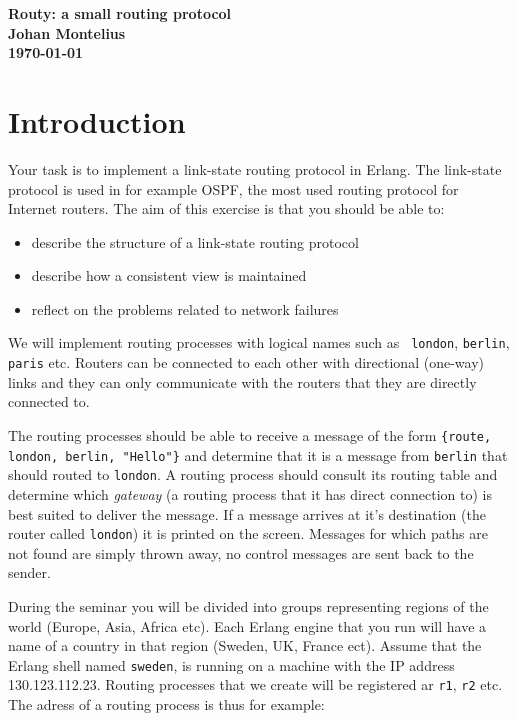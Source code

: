 \documentclass[a4paper, 11pt]{article}
\newcommand{\nnsection}[1]{
\section*{#1}
\addcontentsline{toc}{section}{#1}
}
\begin{document}
\begin{center}
\vspace{20pt}
\textbf{\large Routy: a small routing protocol}\\
\vspace{10pt}
\textbf{Johan Montelius}\\
\vspace{10pt}
\textbf{\today}
\end{center}

\nnsection{Introduction}

Your task is to implement a link-state routing protocol in Erlang. The
link-state protocol is used in for example OSPF, the most used routing
protocol for Internet routers. The aim of this exercise is that you
should be able to:

\begin{itemize}
\item describe the structure of a link-state routing protocol
\item describe how a consistent view is maintained
\item reflect on the problems related to network failures
\end{itemize}

We will implement routing processes with logical names such as {\tt
london}, {\tt berlin}, {\tt paris} etc. Routers can be connected to
each other with directional (one-way) links  and they can only communicate with
the routers that they are directly connected to.

The routing processes should be able to receive a message of the form
{\tt \{route, london, berlin, "Hello"\}} and determine that it is a
message from {\tt berlin} that should routed to {\tt london}. A
routing process should consult its routing table and determine which
{\em gateway} (a routing process that it has direct connection to) is
best suited to deliver the message. If a message arrives at it's
destination (the router called {\tt london}) it is printed on the
screen. Messages for which paths are not found are simply thrown away,
no control messages are sent back to the sender.

During the seminar you will be divided into groups representing
regions of the world (Europe, Asia, Africa etc). Each Erlang engine
that you run will have a name of a country in that region (Sweden, UK,
France ect). Assume that the Erlang shell named {\tt sweden}, is
running on a machine with the IP address 130.123.112.23. Routing
processes that we create will be registered ar {\tt r1}, {\tt r2}
etc. The adress of a routing process is thus for example:
\end{document}
